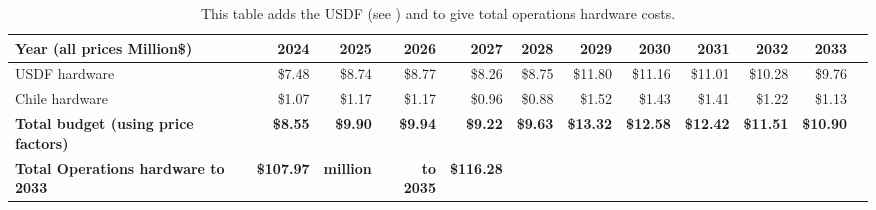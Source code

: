 \tiny \begin{longtable} { |p{}  |r  |r  |r  |r  |r  |r  |r  |r  |r  |r  |r |} 
\caption{This table adds the USDF (see ) and  to give total operations hardware costs. \label{tab:opsSummary}}\\ 
\hline 
\textbf{Year  (all prices Million\$)}&\textbf{2024}&\textbf{2025}&\textbf{2026}&\textbf{2027}&\textbf{2028}&\textbf{2029}&\textbf{2030}&\textbf{2031}&\textbf{2032}&\textbf{2033} \\ \hline
{USDF hardware}&{\$7.48}&{\$8.74}&{\$8.77}&{\$8.26}&{\$8.75}&{\$11.80}&{\$11.16}&{\$11.01}&{\$10.28}&{\$9.76} \\ \hline
{Chile hardware}&{\$1.07}&{\$1.17}&{\$1.17}&{\$0.96}&{\$0.88}&{\$1.52}&{\$1.43}&{\$1.41}&{\$1.22}&{\$1.13} \\ \hline
\textbf{Total budget (using price factors)}&\textbf{\$8.55}&\textbf{\$9.90}&\textbf{\$9.94}&\textbf{\$9.22}&\textbf{\$9.63}&\textbf{\$13.32}&\textbf{\$12.58}&\textbf{\$12.42}&\textbf{\$11.51}&\textbf{\$10.90} \\ \hline
\textbf{Total Operations hardware to 2033}&\textbf{\$107.97}&\textbf{million}&\textbf{to 2035}&\textbf{\$116.28}&&&&&& \\ \hline
\end{longtable} \normalsize

